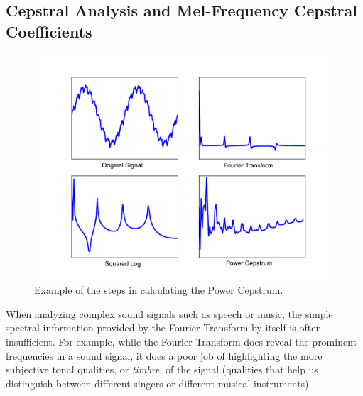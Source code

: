 \subsection*{Cepstral Analysis and Mel-Frequency Cepstral Coefficients}
\begin{figure}
\centering
\includegraphics[width=\textwidth]{PowerCepstrum.pdf}
\caption{Example of the steps in calculating the Power Cepstrum.}
\label{fourierext:pc}
\end{figure}
When analyzing complex sound signals such as speech or music, the simple spectral information provided by
the Fourier Transform by itself is often insufficient. For example, while the Fourier Transform does reveal
the prominent frequencies in a sound signal, it does a poor job of highlighting the more subjective 
tonal qualities, or \emph{timbre}, of the signal (qualities that help us distinguish between different singers
or different musical instruments). 

